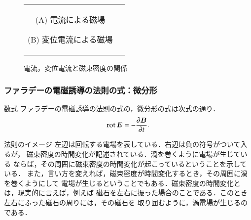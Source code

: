                 \begin{figure}[hbt]
                    \begin{tabular}{cc}
                        \begin{minipage}{0.5\hsize}
                            \begin{center}
                                {dennryu_to_jisokumitudo.pdf}

                                (A) 電流による磁場
                            \end{center}
                        \end{minipage}
                        \begin{minipage}{0.5\hsize}
                            \begin{center}
                                {hennnidenryu_to_jisokumitudo.pdf}

                                (B) 変位電流による磁場
                            \end{center}
                        \end{minipage}
                    \end{tabular}
                        \caption{電流，変位電流と磁束密度の関係}
                        \label{fig:I_i_B}
                \end{figure}


            \subsubsection{ファラデーの電磁誘導の法則の式：微分形}
            \begin{mysmallsec}{数式}
                ファラデーの電磁誘導の法則の式の，微分形の式は次式の通り．
                \begin{align}
                    \mathrm{rot}\, \boldsymbol{E} = - \frac{\partial \boldsymbol{B}}{\partial t}.
                \end{align}
            \end{mysmallsec}

            \begin{mysmallsec}{法則のイメージ}
                左辺は回転する電場を表している．右辺は負の符号がついて入るが，
                磁束密度の時間変化が記述されている．渦を巻くように電場が生じている
                ならば，その周囲に磁束密度の時間変化が起こっているということを示している．
                また，言い方を変えれば，磁束密度が時間変化するとき，その周囲に渦を巻くようにして
                電場が生じるということでもある．磁束密度の時間変化とは，現実的に言えば，例えば
                磁石を左右に振った場合のことである．このとき左右にふった磁石の周りには，その磁石を
                取り囲むように，渦電場が生じるのである．
            \end{mysmallsec}

